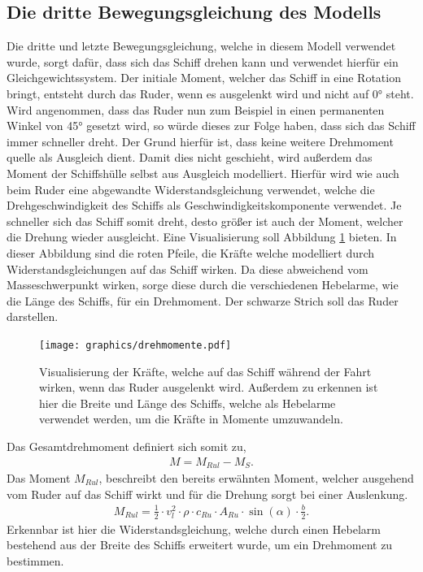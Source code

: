 \documentclass[]{iat}
\begin{document}
\subsection{Die dritte Bewegungsgleichung des Modells} \label{sec:eom3}
Die dritte und letzte Bewegungsgleichung, welche in diesem Modell verwendet wurde, sorgt
dafür, dass sich das Schiff drehen kann und verwendet hierfür ein Gleichgewichtssystem. Der initiale Moment, welcher das Schiff in eine Rotation bringt, entsteht durch das Ruder, wenn es ausgelenkt wird und nicht auf 0° steht. Wird angenommen, dass das Ruder nun zum Beispiel in einen permanenten Winkel von 45° gesetzt wird, so würde dieses zur Folge haben, dass sich das Schiff immer schneller dreht. Der Grund hierfür ist, dass keine weitere Drehmoment quelle als Ausgleich dient. Damit dies nicht geschieht, wird außerdem das Moment der Schiffshülle selbst aus Ausgleich modelliert. Hierfür wird wie auch beim Ruder eine abgewandte Widerstandsgleichung verwendet, welche die Drehgeschwindigkeit des Schiffs als Geschwindigkeitskomponente verwendet. Je schneller sich das Schiff somit dreht, desto größer ist auch der Moment, welcher die Drehung wieder ausgleicht. Eine Visualisierung soll Abbildung \ref{abb:drehmomente} bieten. In dieser Abbildung sind die roten Pfeile, die Kräfte welche modelliert durch Widerstandsgleichungen auf das Schiff wirken. Da diese abweichend vom Masseschwerpunkt wirken, sorge diese durch die verschiedenen Hebelarme, wie die Länge des Schiffs, für ein Drehmoment. Der schwarze Strich soll das Ruder darstellen.
\begin{figure}[H]
    \texttt{[image: graphics/drehmomente.pdf]}
    \centering
    \caption{Visualisierung der Kräfte, welche auf das Schiff während der Fahrt wirken, wenn das Ruder ausgelenkt wird. Außerdem zu erkennen ist hier die Breite und Länge des Schiffs, welche als Hebelarme verwendet werden, um die Kräfte in Momente umzuwandeln.}
    \label{abb:drehmomente}
\end{figure}
Das Gesamtdrehmoment definiert sich somit zu,
\begin{align}
    M = M_{Rul} - M_S.
\end{align}
Das Moment $M_{Rul}$, beschreibt den bereits erwähnten Moment, welcher ausgehend vom Ruder auf das Schiff wirkt und für die Drehung sorgt bei einer Auslenkung.
\begin{align}
    M_{Rul} = \frac{1}{2} \cdot v_l^2 \cdot \rho \cdot c_{Ru} \cdot A_{Ru} \cdot \sin(\alpha) \cdot \frac{b}{2}.
\end{align}
Erkennbar ist hier die Widerstandsgleichung, welche durch einen Hebelarm bestehend aus der Breite des Schiffs erweitert wurde, um ein Drehmoment zu bestimmen.
\end{document}
